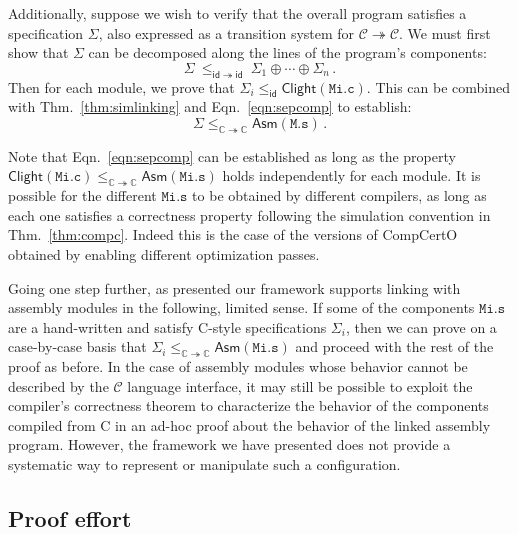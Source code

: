 \documentclass[sigplan,10pt,review,anonymous]{acmart}
\newcommand{\kw}[1]{\ensuremath{ \mathsf{#1} }}
\begin{document}
Additionally,
suppose we wish to verify that the overall program
satisfies a specification $\Sigma$,
also expressed as a transition system
for $\mathcal{C} \twoheadrightarrow \mathcal{C}$.
We must first show that $\Sigma$ can be decomposed
along the lines of the program's components:
\[
    \Sigma \: \le_{\kw{id} \twoheadrightarrow \kw{id}} \:
    \Sigma_1 \oplus \cdots \oplus \Sigma_n \,.
\]
Then for each module, we prove that
$\Sigma_i \le_\kw{id} \kw{Clight}(\mathtt{Mi.c})$.
This can be combined with Thm.~\ref{thm:simlinking} and Eqn.~\ref{eqn:sepcomp}
to establish:
\[
    \Sigma \le_{\mathbb{C} \twoheadrightarrow \mathbb{C}} \kw{Asm}(\mathtt{M.s}) \,.
\]

Note that Eqn.~\ref{eqn:sepcomp} can be established
as long as the property
$\kw{Clight}(\mathtt{Mi.c})
 \le_{\mathbb{C} \twoheadrightarrow \mathbb{C}}
 \kw{Asm}(\mathtt{Mi.s})$
holds independently for each module.
It is possible for the different $\mathtt{Mi.s}$
to be obtained by different compilers,
as long as each one satisfies a correctness property
following the simulation convention in Thm.~\ref{thm:compc}.
Indeed this is the case of the versions of CompCertO
obtained by enabling different optimization passes.

Going one step further,
as presented our framework supports linking
with assembly modules in the following, limited sense.
If some of the components $\mathtt{Mi.s}$
are a hand-written and
satisfy C-style specifications $\Sigma_i$,
then we can prove on a case-by-case basis that
$\Sigma_i \le_{\mathbb{C} \twoheadrightarrow \mathbb{C}} \kw{Asm}(\mathtt{Mi.s})$
and proceed with the rest of the proof as before.
In the case of assembly modules
whose behavior cannot be described
by the $\mathcal{C}$ language interface,
it may still be possible to exploit the compiler's
correctness theorem
to characterize the behavior of the components
compiled from C
in an ad-hoc proof about the behavior of the linked
assembly program.
However, the framework we have presented
does not provide a systematic way
to represent or manipulate
such a configuration.


\subsection{Proof effort} \label{sec:effort} %
\end{document}
